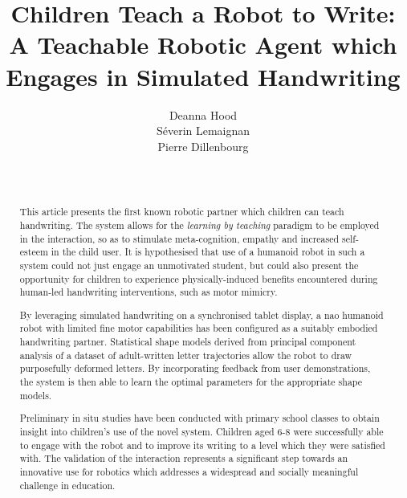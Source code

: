\documentclass{sig-alternate}
\title{\LARGE \bf
Children Teach a Robot to Write: A Teachable Robotic Agent which Engages in Simulated Handwriting %
}
\author{
\alignauthor
Deanna Hood\\
Séverin Lemaignan\\
Pierre Dillenbourg\\
   \affaddr{Computer-Human Interaction in Learning and Instruction Laboratory (CHILI)}\\
   \affaddr{École Polytechnique Fédérale\\ de Lausanne (EPFL)}\\
   \email{firstname.lastname@epfl.ch}
}
\begin{document}
\maketitle

\begin{abstract}




This article presents the first known robotic partner which children can teach handwriting. 
The system allows for the
\emph{learning by teaching} paradigm to be employed in the interaction, so as to
stimulate meta-cognition, empathy and increased self-esteem in the child user. 
It is
hypothesised that use of a humanoid robot in such a system could not just engage an unmotivated student,
but could also present the opportunity for children to experience physically-induced
benefits encountered during human-led handwriting interventions, such as motor
mimicry.

By leveraging simulated handwriting on a synchronised tablet display, a {\sc nao}
humanoid robot with limited fine motor capabilities has been configured as a
suitably embodied handwriting partner. Statistical shape models derived from principal
component analysis of a dataset of adult-written letter trajectories allow
the robot to draw purposefully deformed letters. By incorporating feedback from user
demonstrations, the system is then able to learn the optimal parameters for the
appropriate shape models. 

Preliminary in situ studies have been conducted with primary school classes to obtain
insight into children's use of the novel system. 
Children aged 6-8 were successfully able to engage with the robot and to improve its 
writing to a level which they were satisfied with. The validation of the interaction
represents a significant step towards an innovative use for robotics which addresses a
widespread and socially meaningful challenge in education. 


\end{abstract}
\end{document}
